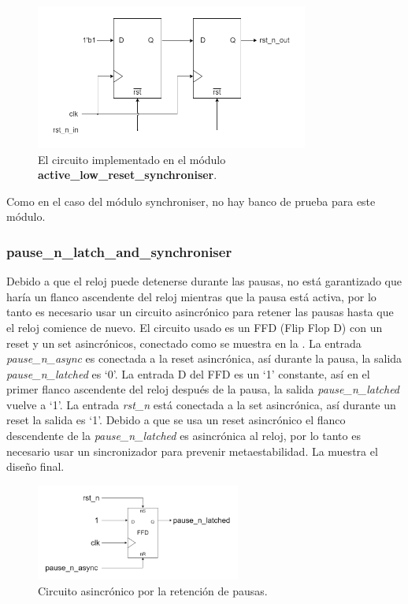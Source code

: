 \documentclass[a4paper, twoside, 11pt]{report}
\begin{document}
\begin{figure}[htb]
  \centering
  \includegraphics[width=0.8\textwidth]{./img/active_low_reset_synchroniser.drawio}
  \caption{El circuito implementado en el módulo \textbf{active\_low\_reset\_synchroniser}.}
  \label{fig:active_low_reset_synchroniser}
\end{figure}

Como en el caso del módulo synchroniser, no hay banco de prueba para este módulo.

\FloatBarrier
\subsubsection{pause\_n\_latch\_and\_synchroniser}

Debido a que el reloj puede detenerse durante las pausas, no está garantizado que haría un flanco ascendente del reloj mientras que la pausa está activa, por lo tanto es necesario usar un circuito asincrónico para retener las pausas hasta que el reloj comience de nuevo. El circuito usado es un FFD (Flip Flop D) con un reset y un set asincrónicos, conectado como se muestra en la . La entrada \textit{pause\_n\_async} es conectada a la reset asincrónica, así durante la pausa, la salida \textit{pause\_n\_latched} es ‘0’. La entrada D del FFD es un ‘1’ constante, así en el primer flanco ascendente del reloj después de la pausa, la salida \textit{pause\_n\_latched} vuelve a ‘1’. La entrada \textit{rst\_n} está conectada a la set asincrónica, así durante un reset la salida es ‘1’. Debido a que se usa un reset asincrónico el flanco descendente de la  \textit{pause\_n\_latched} es asincrónica al reloj, por lo tanto es necesario usar un sincronizador para prevenir metaestabilidad. La  muestra el diseño final.

\begin{figure}[htb]
  \centering
  \includegraphics[width=0.6\textwidth]{./img/pause_latch_and_synch1_latching.drawio}
  \caption{Circuito asincrónico por la retención de pausas.}
  \label{fig:pause_n_latch}
\end{figure}
\end{document}
